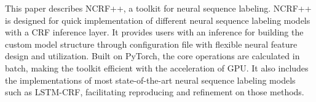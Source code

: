 This paper describes NCRF++, a toolkit for neural sequence labeling. NCRF++ is designed for quick implementation of different neural sequence labeling models with a CRF inference layer. It provides users with an inference for building the custom model structure through configuration file with flexible neural feature design and utilization. Built on PyTorch, the core operations are calculated in batch, making the toolkit efficient with the acceleration of GPU. It also includes the implementations of most state-of-the-art neural sequence labeling models such as LSTM-CRF, facilitating reproducing and refinement on those methods.
